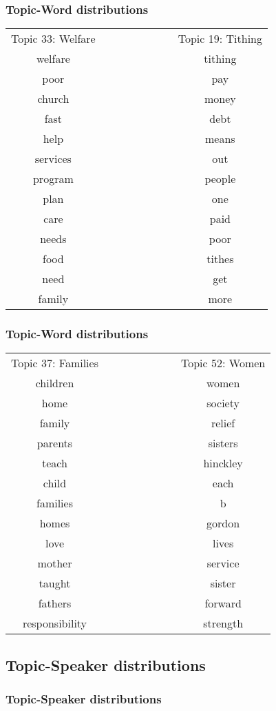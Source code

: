 \documentclass{beamer}
\begin{document}
\begin{frame}
  \frametitle{Topic-Word distributions}
  \begin{tabular}{|c|c|c|}
	Topic 33: Welfare &\ \ \ \ \ \ \ \ \ \ \ &Topic 19: Tithing \\
	welfare&&tithing \\
	poor&&pay \\
	church&&money \\
	fast&&debt \\
	help&&means \\
	services&&out \\
	program&&people \\
	plan&&one \\
	care&&paid \\
	needs&&poor \\
	food&&tithes \\
	need&&get \\
	family&&more \\
  \end{tabular}
\end{frame}
\begin{frame}
  \frametitle{Topic-Word distributions}
  \begin{tabular}{|c|c|c|}
	Topic 37: Families &\ \ \ \ \ \ \ \ \ \ \ &Topic 52: Women \\
	children&&women \\
	home&&society \\
	family&&relief \\
	parents&&sisters \\
	teach&&hinckley \\
	child&&each \\
	families&&b \\
	homes&&gordon \\
	love&&lives \\
	mother&&service \\
	taught&&sister \\
	fathers&&forward \\
	responsibility&&strength \\
  \end{tabular}
\end{frame}

\subsection{Topic-Speaker distributions}

\begin{frame}
  \frametitle{Topic-Speaker distributions}
\end{frame}
\end{document}
